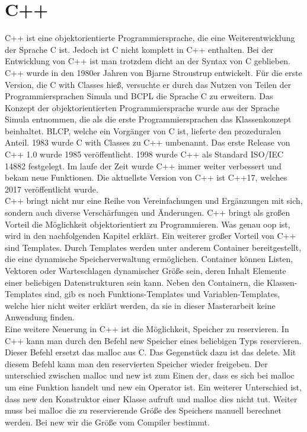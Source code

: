 \section{C++ }
C++ ist eine objektorientierte Programmiersprache, die eine Weiterentwicklung der Sprache C ist. Jedoch ist C nicht komplett in C++ enthalten. Bei der Entwicklung von C++ ist man trotzdem dicht an der Syntax von C geblieben. C++ wurde in den 1980er Jahren von Bjarne Stroustrup entwickelt. Für die erste Version, die \glqq C with Classes\grqq{} hieß, versuchte er durch das Nutzen von Teilen der Programmiersprachen Simula und BCPL die Sprache C zu erweitern. Das Konzept der objektorientierten Programmiersprache  wurde aus der Sprache Simula entnommen, die als die erste Programmiersprachen das Klassenkonzept beinhaltet.  BLCP, welche ein Vorgänger von C ist, lieferte den  prozeduralen Anteil.   1983 wurde \glqq C with Classes\grqq{} zu C++ umbenannt. Das erste Release von C++ 1.0 wurde 1985 veröffentlicht. 1998 wurde C++ als Standard \glqq ISO/IEC 14882\grqq{} festgelegt. Im laufe der Zeit wurde C++ immer weiter verbessert und bekam neue Funktionen. Die aktuellste Version von C++ ist C++17, welches 2017 veröffentlicht wurde.\\
C++ bringt nicht nur eine Reihe von Vereinfachungen und Ergänzungen mit sich, sondern auch diverse Verschärfungen und Änderungen. 
C++ bringt als großen Vorteil die Möglichkeit objektorientiert zu Programmieren. Was genau  \acl{oop} ist, wird in den nachfolgenden Kapitel erklärt. Ein weiterer großer Vorteil von C++ sind Templates. Durch Templates werden unter anderem Container bereitgestellt, die eine dynamische Speicherverwaltung ermöglichen. Container können Listen, Vektoren oder Warteschlagen dynamischer Größe sein, deren Inhalt Elemente einer beliebigen Datenstrukturen sein kann. Neben den Containern, die Klassen-Templates  sind,  gib es noch Funktions-Templates und Variablen-Templates, welche hier nicht weiter erklärt werden, da sie in dieser Masterarbeit keine Anwendung finden. \\
Eine weitere Neuerung in C++ ist die Möglichkeit, Speicher zu reservieren. In C++ kann man durch den Befehl \glqq new\grqq{} Speicher eines beliebigen Typs reservieren. Dieser Befehl ersetzt das \glqq malloc\grqq{} aus C.  Das Gegenstück dazu ist das  \glqq delete\grqq{}. Mit diesem Befehl kann man den reservierten Speicher wieder freigeben. Der unterschied zwischen  \glqq malloc\grqq{} und \glqq new\grqq{} ist zum Einen der, dass es sich bei \glqq malloc\grqq{} um eine Funktion handelt  und \glqq new\grqq{} ein Operator ist.  Ein weiterer Unterschied  ist, dass \glqq new\grqq{} den Konstruktor einer Klasse aufruft und \glqq malloc\grqq{} dies nicht tut. Weiter muss bei \glqq malloc\grqq{} die zu reservierende Größe des Speichers manuell berechnet werden. Bei  \glqq new\grqq{} wir die Größe vom Compiler bestimmt. \\
